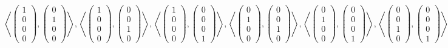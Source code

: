 \documentclass{scrreprt}
\begin{document}
\[
  \left\langle
    \begin{pmatrix}1\\0\\0\\0\end{pmatrix},
    \begin{pmatrix}0\\1\\0\\0\end{pmatrix}
  \right\rangle,
  \left\langle
    \begin{pmatrix}1\\0\\0\\0\end{pmatrix},
    \begin{pmatrix}0\\0\\1\\0\end{pmatrix}
  \right\rangle,
  \left\langle
    \begin{pmatrix}1\\0\\0\\0\end{pmatrix},
    \begin{pmatrix}0\\0\\0\\1\end{pmatrix}
  \right\rangle,
  \left\langle
    \begin{pmatrix}0\\1\\0\\0\end{pmatrix},
    \begin{pmatrix}0\\0\\1\\0\end{pmatrix}
  \right\rangle,
  \left\langle
    \begin{pmatrix}0\\1\\0\\0\end{pmatrix},
    \begin{pmatrix}0\\0\\0\\1\end{pmatrix}
  \right\rangle,
  \left\langle
    \begin{pmatrix}0\\0\\1\\0\end{pmatrix},
    \begin{pmatrix}0\\0\\0\\1\end{pmatrix}
  \right\rangle,
\]
\end{document}
